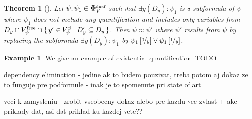 \documentclass[
  digital, %
  twoside, %
  table,   %
  nolof,     %
  nolot,     %
]{fithesis3}
\let\setbuilder\set
\newcommand{\simpleset}[1]{\{{#1}\}}
\renewcommand{\set}[1]{\normalexpandarg\IfSubStr{#1}{|}{\setbuilder{#1}}{\simpleset{#1}}}
\newtheorem{theorem}{Theorem}[chapter] %
\theoremstyle{definition}
\newtheorem{example}{Example}
\theoremstyle{remark}
\newcommand{\seman}[1]{\left\llbracket {#1} \right\rrbracket}
\newcommand{\substitute}[2]{\left[ \nicefrac{#2}{#1} \right]}
\newcommand{\DQBF}[1]{\mathbf{\Phi}_{#1}^{\text{\tiny dnnf}}}
\begin{document}
\begin{theorem}[{\cite[Theorem 5]{HQSquantifierLocalization}}]
  Let $\psi, \psi_1 \in \DQBF{V}$ such that $\exists y(D_y) : \psi_1$ is a subformula of $\psi$ where $\psi_1$ does not include any quantification and includes only variables from $D_y \cap V_{\psi}^{\text{free}} \cap \set{y' \in V_{\psi}^{\exists} | D_y' \subseteq D_y}$. Then $\psi \approx \psi'$ where $\psi'$ results from $\psi$ by replacing the subformula $\exists y(D_y) : \psi_1$ by $\psi_1\substitute{y}{0} \lor \psi_1\substitute{y}{1}$.
\end{theorem}
\begin{example}
We give an example of existential quantification. TODO
\end{example}


dependency elimination - jedine ak to budem pouzivat, treba potom aj dokaz ze to funguje pre podformule - inak je to spomenute pri state of art

veci k zamysleniu - zrobit vseobecny dokaz alebo pre kazdu vec zvlast + ake priklady dat, asi dat priklad ku kazdej vete??


\end{document}

